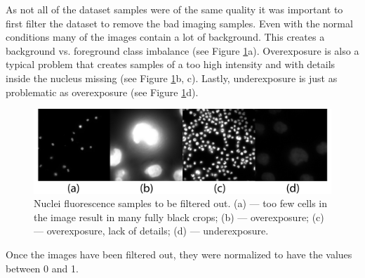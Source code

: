 As not all of the dataset samples were of the same quality it was important to first filter the dataset to remove the bad imaging samples. Even with the normal conditions many of the images contain a lot of background. This creates a background vs. foreground class imbalance (see Figure \ref{fig:bad-smaples}a). Overexposure is also a typical problem that creates samples of a too high intensity and with details inside the nucleus missing (see Figure \ref{fig:bad-smaples}b, c). Lastly, underexposure is just as problematic as overexposure (see Figure \ref{fig:bad-smaples}d).

\begin{figure}[H]
	\begin{center}
		\includegraphics[width=0.6\linewidth]{bilder/nuclei/filter-out.png}
		\caption[Nuclei fluorescence samples to be filtered out]%
		{Nuclei fluorescence samples to be filtered out. (a) --- too few cells in the image result in many fully black crops; (b) --- overexposure; (c) --- overexposure, lack of details; (d) --- underexposure.}\label{fig:bad-smaples}
	\end{center}
\end{figure}

Once the images have been filtered out, they were normalized to have the values between 0 and 1.
